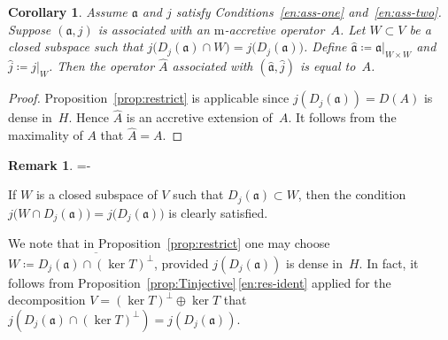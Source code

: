 \documentclass[a4paper,oneside,12pt]{amsart}
\makeatletter
\theoremstyle{plain}
\newtheorem{corollary}[theorem]{Corollary}
\theoremstyle{definition}
\newtheorem{remark}[theorem]{Remark}
\newenvironment{parenum}[1][]{\my@savedparindent=\parindent\ifthenelse{\equal{#1}{}}{\asparaenum}{\asparaenum[#1]}\advance\itemindent-\my@savedparindent
\patchcmd{\@item}{\ignorespaces}{{\itemindent={\the\itemindent}
\def{}}\ignorespaces}{}{}}
{\endasparaenum}
\makeatother
\begin{document}
\begin{corollary}\label{cor:macc-restrict}
Assume ${{\mathfrak{{a}}}}$ and $j$ satisfy Conditions~\ref{en:ass-one} and~\ref{en:ass-two}. 
Suppose $({{\mathfrak{{a}}}},j)$ is associated with an {\ensuremath{\text{m}}}-accretive operator~$A$.
Let $W\subset V$ be a closed subspace such that $j\bigl(D_j({{\mathfrak{{a}}}})\cap W\bigr)=j\bigl(D_j({{\mathfrak{{a}}}})\bigr)$.
Define ${{\mathfrak{{\hat{a}}}}}\coloneqq{\ensuremath{{{{\mathfrak{{a}}}}}|_{{W\times W}}}}$ and $\hat{j}\coloneqq{\ensuremath{{j}|_{{W}}}}$.
Then the operator $\widehat{A}$ associated with $({{\mathfrak{{\hat{a}}}}},\hat{j})$ is equal to~$A$.
\end{corollary}
\begin{proof}
Proposition~\ref{prop:restrict} is applicable since $j(D_j({{\mathfrak{{a}}}}))=D(A)$ is dense in~$H$.
Hence $\widehat{A}$ is an accretive extension of~$A$.
It follows from the maximality of $A$ that $\widehat{A}=A$.
\end{proof}

\begin{remark}
\begin{parenum}[1.]
\item
If $W$ is a closed subspace of $V$ such that $D_j({{\mathfrak{{a}}}})\subset W$, then the condition 
$j\bigl(W\cap D_j({{\mathfrak{{a}}}})\bigr)=j\bigl(D_j({{\mathfrak{{a}}}})\bigr)$ is clearly satisfied.

\item 
We note that in Proposition~\ref{prop:restrict} one may choose $W\coloneqq{\overline{{D_j({{\mathfrak{{a}}}})\cap(\ker T)^\perp}}}$,
provided $j(D_j({{\mathfrak{{a}}}}))$ is dense in~$H$.
In fact, it follows from Proposition~\ref{prop:Tinjective}\,\ref{en:res-ident} applied for the decomposition $V=(\ker T)^\perp\oplus\ker T$ that $j(D_j({{\mathfrak{{a}}}})\cap(\ker T)^\perp) = j(D_j({{\mathfrak{{a}}}}))$.
\end{parenum}
\end{remark}
\end{document}

